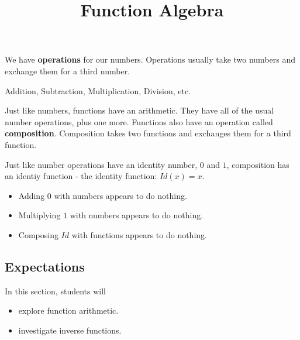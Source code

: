 \documentclass{ximera}
\title{Function Algebra}
\begin{document}
\begin{abstract}

\end{abstract}
\maketitle
















We have \textbf{operations} for our numbers.  Operations usually take two numbers and exchange them for a third number.

\begin{center}
Addition, Subtraction, Multiplication, Division, etc.
\end{center}



Just like numbers, functions have an arithmetic.  They have all of the usual number operations, plus one more.  Functions also have an operation called \textbf{composition}.  Composition takes two functions and exchanges them for a third function.

Just like number operations have an identity number, $0$ and $1$, composition has an identiy function - the identity function: $Id(x) = x$.


\begin{itemize}
\item Adding $0$ with numbers appears to do nothing.
\item Multiplying $1$ with numbers appears to do nothing.
\item Composing $Id$ with functions appears to do nothing.
\end{itemize}













\subsection{Expectations}


\begin{sectionOutcomes}
In this section, students will 

\begin{itemize}
\item explore function arithmetic.
\item investigate inverse functions.
\end{itemize}
\end{sectionOutcomes}
\end{document}
